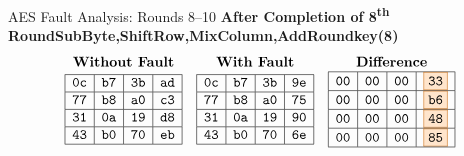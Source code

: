 \documentclass{beamer}
\newenvironment{tres important}[2][]{
	\setkeys{EmphEqEnv}{#2}
	\setkeys{EmphEqOpt}{box={\setlength{\fboxsep}{10pt}\fcolorbox{myNewColorA}{white}},#1}
	\EmphEqMainEnv}
{\endEmphEqMainEnv}
\begin{document}
\begin{frame}[fragile]{AES Fault Analysis: Rounds 8–10}
    \vspace{0.5em}
    \textbf{After Completion of 8\textsuperscript{th} RoundSubByte,ShiftRow,MixColumn,AddRoundkey(8)}
    \[
    \begin{array}{ccc}
    \textbf{Without Fault} & \textbf{With Fault} & \textbf{Difference} \\
    
    \begin{array}{|c|c|c|c|}
    \hline \texttt{0c} & \texttt{b7} & \texttt{3b} & \texttt{ad} \\
    \hline \texttt{77} & \texttt{b8} & \texttt{a0} & \texttt{c3} \\
    \hline \texttt{31} & \texttt{0a} & \texttt{19} & \texttt{d8} \\
    \hline \texttt{43} & \texttt{b0} & \texttt{70} & \texttt{eb} \\
    \hline
    \end{array}
    &
    \begin{array}{|c|c|c|c|}
    \hline \texttt{0c} & \texttt{b7} & \texttt{3b} & \texttt{9e} \\
    \hline \texttt{77} & \texttt{b8} & \texttt{a0} & \texttt{75} \\
    \hline \texttt{31} & \texttt{0a} & \texttt{19} & \texttt{90} \\
    \hline \texttt{43} & \texttt{b0} & \texttt{70} & \texttt{6e} \\
    \hline
    \end{array}
    &
    \begin{array}{|c|c|c|c|}
    \hline \texttt{00} & \texttt{00} & \texttt{00} & \fcolorbox{orange!80!black}{orange!20}{\texttt{33}} \\
    \hline \texttt{00} & \texttt{00} & \texttt{00} & \fcolorbox{orange!80!black}{orange!20}{\texttt{b6}} \\
    \hline \texttt{00} & \texttt{00} & \texttt{00} & \fcolorbox{orange!80!black}{orange!20}{\texttt{48}} \\
    \hline \texttt{00} & \texttt{00} & \texttt{00} & \fcolorbox{orange!80!black}{orange!20}{\texttt{85}} \\
    \hline
    \end{array}
    \end{array}
    \]
    \end{frame}
\end{document}
